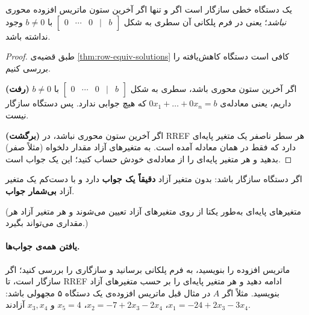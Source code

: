 \begin{theorem}\label{thm:consistency}
یک دستگاه خطی سازگار  است اگر و تنها اگر آخرین ستون ماتریس افزوده  محوری \emph{نباشد}؛ یعنی در فرم پلکانی آن سطری به شکل $\begin{bmatrix}0&\cdots&0&|&b\end{bmatrix}$ با $b\neq0$ وجود نداشته باشد.
\end{theorem}
\begin{proof}
طبق قضیه‌ی \ref{thm:row-equiv-solutions} کافی است دستگاه کاهش‌یافته را بررسی کنیم.

\textbf{(رفت)} اگر آخرین ستون محوری باشد، سطری به شکل $\begin{bmatrix}0&\cdots&0&|&b\end{bmatrix}$ با $b\neq0$ داریم، یعنی معادله‌ی $0x_1+\dots+0x_n=b$ که هیچ جوابی ندارد. پس دستگاه سازگار نیست.

\textbf{(برگشت)} اگر آخرین ستون محوری نباشد، در RREF هر سطر ناصفر یک متغیر پایه‌ای دارد که فقط در همان معادله آمده است. به متغیرهای آزاد مقدار دلخواه (مثلاً صفر) بدهید و هر متغیر پایه‌ای را از معادله‌ی خودش حساب کنید؛ این یک جواب است.
\end{proof}

\begin{theorem}[یکتایی]
اگر دستگاه سازگار باشد: بدون متغیر آزاد  \textbf{دقیقاً یک جواب} دارد و با دست‌کم یک متغیر آزاد \textbf{بی‌شمار جواب}.
\end{theorem}
(متغیرهای پایه‌ای به‌طور یکتا از روی متغیرهای آزاد تعیین می‌شوند و هر متغیر آزاد هر مقداری می‌تواند بگیرد.)

\paragraph{یافتن همه‌ی جواب‌ها.} ماتریس افزوده را بنویسید، به فرم پلکانی برسانید و سازگاری را بررسی کنید؛ اگر سازگار است، تا RREF ادامه دهید و هر متغیر پایه‌ای را بر حسب متغیرهای آزاد بنویسید. مثلاً اگر $A$ در مثال قبل ماتریس افزوده‌ی یک دستگاه ۵ مجهولی باشد: $x_1=-24+2x_3-3x_4$، $x_2=-7+2x_3-2x_4$، $x_5=4$ و $x_3,x_4$ آزادند.

